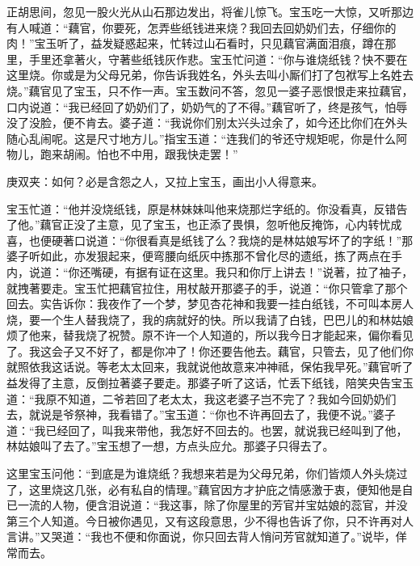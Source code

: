 \begin{parag}
    正胡思间，忽见一股火光从山石那边发出，将雀儿惊飞。宝玉吃一大惊，又听那边有人喊道：“藕官，你要死，怎弄些纸钱进来烧？我回去回奶奶们去，仔细你的肉！”宝玉听了，益发疑惑起来，忙转过山石看时，只见藕官满面泪痕，蹲在那里，手里还拿著火，守著些纸钱灰作悲。宝玉忙问道：“你与谁烧纸钱？快不要在这里烧。你或是为父母兄弟，你告诉我姓名，外头去叫小厮们打了包袱写上名姓去烧。”藕官见了宝玉，只不作一声。宝玉数问不答，忽见一婆子恶恨恨走来拉藕官，口内说道：“我已经回了奶奶们了，奶奶气的了不得。”藕官听了，终是孩气，怕辱没了没脸，便不肯去。婆子道：“我说你们别太兴头过余了，如今还比你们在外头随心乱闹呢。这是尺寸地方儿。”指宝玉道：“连我们的爷还守规矩呢，你是什么阿物儿，跑来胡闹。怕也不中用，跟我快走罢！”\begin{note}庚双夹：如何？必是含怨之人，又拉上宝玉，画出小人得意来。\end{note}宝玉忙道：“他并没烧纸钱，原是林妹妹叫他来烧那烂字纸的。你没看真，反错告了他。”藕官正没了主意，见了宝玉，也正添了畏惧，忽听他反掩饰，心内转忧成喜，也便硬著口说道：“你很看真是纸钱了么？我烧的是林姑娘写坏了的字纸！”那婆子听如此，亦发狠起来，便弯腰向纸灰中拣那不曾化尽的遗纸，拣了两点在手内，说道：“你还嘴硬，有据有证在这里。我只和你厅上讲去！”说著，拉了袖子，就拽著要走。宝玉忙把藕官拉住，用杖敲开那婆子的手，说道：“你只管拿了那个回去。实告诉你：我夜作了一个梦，梦见杏花神和我要一挂白纸钱，不可叫本房人烧，要一个生人替我烧了，我的病就好的快。所以我请了白钱，巴巴儿的和林姑娘烦了他来，替我烧了祝赞。原不许一个人知道的，所以我今日才能起来，偏你看见了。我这会子又不好了，都是你冲了！你还要告他去。藕官，只管去，见了他们你就照依我这话说。等老太太回来，我就说他故意来冲神祗，保佑我早死。”藕官听了益发得了主意，反倒拉著婆子要走。那婆子听了这话，忙丢下纸钱，陪笑央告宝玉道：“我原不知道，二爷若回了老太太，我这老婆子岂不完了？我如今回奶奶们去，就说是爷祭神，我看错了。”宝玉道：“你也不许再回去了，我便不说。”婆子道：“我已经回了，叫我来带他，我怎好不回去的。也罢，就说我已经叫到了他，林姑娘叫了去了。”宝玉想了一想，方点头应允。那婆子只得去了。
\end{parag}


\begin{parag}
    这里宝玉问他：“到底是为谁烧纸？我想来若是为父母兄弟，你们皆烦人外头烧过了，这里烧这几张，必有私自的情理。”藕官因方才护庇之情感激于衷，便知他是自已一流的人物，便含泪说道：“我这事，除了你屋里的芳官并宝姑娘的蕊官，并没第三个人知道。今日被你遇见，又有这段意思，少不得也告诉了你，只不许再对人言讲。”又哭道：“我也不便和你面说，你只回去背人悄问芳官就知道了。”说毕，佯常而去。
\end{parag}



